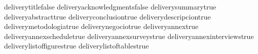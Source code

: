 %

\makeatletter

\newcommand{\delivery@settrue}[1]{\csname #1true\endcsname}
\newcommand{\delivery@setfalse}[1]{\csname #1false\endcsname}

\newif\ifdeliverytitle              %
\newif\ifdeliveryacknowledgments     %
\newif\ifdeliverysummary             %
\newif\ifdeliveryabstract            %

\newif\ifdeliveryconclusion          %
\newif\ifdeliverydescripcion         %
\newif\ifdeliverymetodologia         %
\newif\ifdeliverynegocio             %

\newif\ifdeliveryannex               %
\newif\ifdeliveryannexschedule       %
\newif\ifdeliveryannexsurveys        %
\newif\ifdeliveryannexinterviews      %

\newif\ifdeliverylistoffigures       %
\newif\ifdeliverylistoftables        %

\delivery@setfalse{deliverytitle}
\delivery@setfalse{deliveryacknowledgments}
\delivery@settrue{deliverysummary}
\delivery@settrue{deliveryabstract}
\delivery@settrue{deliveryconclusion}
\delivery@settrue{deliverydescripcion}
\delivery@settrue{deliverymetodologia}
\delivery@settrue{deliverynegocio}
\delivery@settrue{deliveryannex}
\delivery@settrue{deliveryannexschedule}
\delivery@settrue{deliveryannexsurveys}
\delivery@settrue{deliveryannexinterviews}
\delivery@settrue{deliverylistoffigures}
\delivery@settrue{deliverylistoftables}

\makeatother
